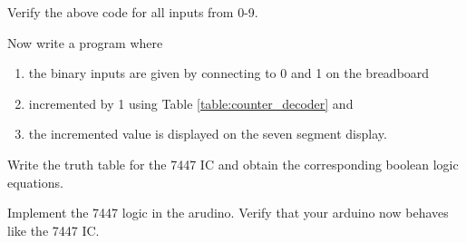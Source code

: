 \documentclass[journal,12pt,twocolumn]{IEEEtran}
\begin{document}
\begin{problem}
Verify the above code for all inputs from 0-9.
\end{problem}
\begin{problem}
Now write a program where 
\begin{enumerate}
\item the binary inputs are given by
connecting to 0 and 1 on the breadboard
\item incremented by 1 using Table \ref{table:counter_decoder} and
\item the incremented value is displayed on the seven segment display.
\end{enumerate}
\end{problem}
\begin{problem}
Write the truth table for the 7447 IC and obtain the corresponding boolean logic equations. 
\end{problem}
\begin{problem}
Implement the 7447 logic in the arudino.  Verify that your arduino now behaves like the 7447 IC.
\end{problem}
\end{document}
